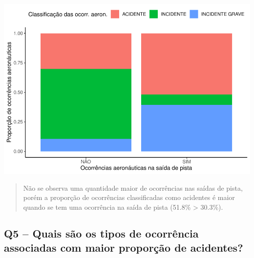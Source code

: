 \documentclass[
]{article}
\newenvironment{Shaded}{\begin{snugshade}}{\end{snugshade}}
\newcommand{\FunctionTok}[1]{\textcolor[rgb]{0.00,0.00,0.00}{#1}}
\newcommand{\NormalTok}[1]{#1}
\newcommand{\OtherTok}[1]{\textcolor[rgb]{0.56,0.35,0.01}{#1}}
\newcommand{\SpecialCharTok}[1]{\textcolor[rgb]{0.00,0.00,0.00}{#1}}
\newcommand{\StringTok}[1]{\textcolor[rgb]{0.31,0.60,0.02}{#1}}
\begin{document}
\begin{center}\includegraphics{4.Relatorio/pdf/index_files/figure-latex/unnamed-chunk-38-1} \end{center}

\begin{quote}
Não se observa uma quantidade maior de ocorrências nas saídas de pista,
porém a proporção de ocorrências classificadas como acidentes é maior
quando se tem uma ocorrência na saída de pista (51.8\% \textgreater{}
30.3\%).
\end{quote}

\hypertarget{q5-quais-suxe3o-os-tipos-de-ocorruxeancia-associadas-com-maior-proporuxe7uxe3o-de-acidentes}{%
\subsection{Q5 -- Quais são os tipos de ocorrência associadas com maior
proporção de
acidentes?}\label{q5-quais-suxe3o-os-tipos-de-ocorruxeancia-associadas-com-maior-proporuxe7uxe3o-de-acidentes}}

\begin{Shaded}
\end{Shaded}
\end{document}
